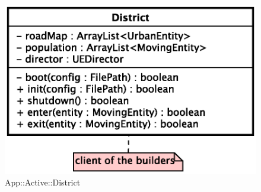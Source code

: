\begin{figure}[h]
\centering
\includegraphics[scale=0.6,keepaspectratio]{images/solution/district.eps}
\caption{App::Active::District}
\label{fig:sd-app-district}
\end{figure}
\FloatBarrier

